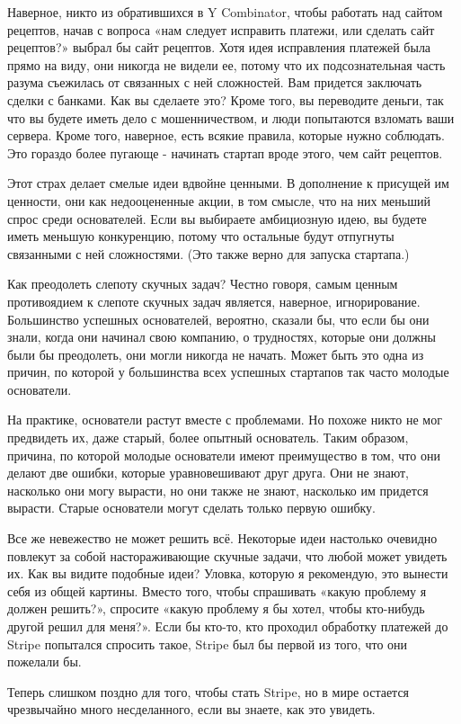 \documentclass[ebook,12pt,oneside,openany]{memoir}
\begin{document}
Наверное, никто из обратившихся в Y Combinator, чтобы работать над
сайтом рецептов, начав с вопроса «нам следует исправить платежи, или
сделать сайт рецептов?» выбрал бы сайт рецептов. Хотя идея исправления
платежей была прямо на виду, они никогда не видели ее, потому что их
подсознательная часть разума съежилась от связанных с ней сложностей.
Вам придется заключать сделки с банками. Как вы сделаете это? Кроме
того, вы переводите деньги, так что вы будете иметь дело с
мошенничеством, и люди попытаются взломать ваши сервера. Кроме того,
наверное, есть всякие правила, которые нужно соблюдать. Это гораздо
более пугающе - начинать стартап вроде этого, чем сайт рецептов.

Этот страх делает смелые идеи вдвойне ценными. В дополнение к присущей
им ценности, они как недооцененные акции, в том смысле, что на них
меньший спрос среди основателей. Если вы выбираете амбициозную идею,
вы будете иметь меньшую конкуренцию, потому что остальные будут
отпугнуты связанными с ней сложностями. (Это также верно для запуска
стартапа.)

Как преодолеть слепоту скучных задач? Честно говоря, самым ценным
противоядием к слепоте скучных задач является, наверное,
игнорирование. Большинство успешных основателей, вероятно, сказали бы,
что если бы они знали, когда они начинал свою компанию, о трудностях,
которые они должны были бы преодолеть, они могли никогда не начать.
Может быть это одна из причин, по которой у большинства всех успешных
стартапов так часто молодые основатели.

На практике, основатели растут вместе с проблемами. Но похоже никто не
мог предвидеть их, даже старый, более опытный основатель. Таким
образом, причина, по которой молодые основатели имеют преимущество в
том, что они делают две ошибки, которые уравновешивают друг друга. Они
не знают, насколько они могу вырасти, но они также не знают, насколько
им придется вырасти. Старые основатели могут сделать только первую
ошибку.

Все же невежество не может решить всё. Некоторые идеи настолько
очевидно повлекут за собой настораживающие скучные задачи, что любой
может увидеть их. Как вы видите подобные идеи? Уловка, которую я
рекомендую, это вынести себя из общей картины. Вместо того, чтобы
спрашивать «какую проблему я должен решить?», спросите «какую проблему
я бы хотел, чтобы кто-нибудь другой решил для меня?». Если бы кто-то,
кто проходил обработку платежей до Stripe попытался спросить такое,
Stripe был бы первой из того, что они пожелали бы.

Теперь слишком поздно для того, чтобы стать Stripe, но в мире остается
чрезвычайно много несделанного, если вы знаете, как это увидеть.
\end{document}
